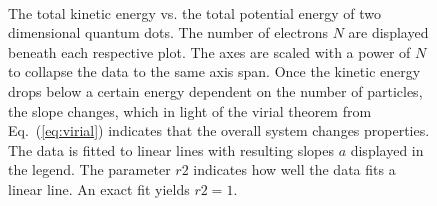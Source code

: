 \begin{figure}[h]
 \begin{center}
   \\
  \caption{The total kinetic energy vs. the total potential energy of two dimensional quantum dots. The number of electrons $N$ are displayed beneath each respective plot. The axes are scaled with a power of $N$ to collapse the data to the same axis span. Once the kinetic energy drops below a certain energy dependent on the number of particles, the slope changes, which in light of the virial theorem from Eq.~(\ref{eq:virial}) indicates that the overall system changes properties. The data is fitted to linear lines with resulting slopes $a$ displayed in the legend. The parameter $r2$ indicates how well the data fits a linear line. An exact fit yields $r2 = 1$.}
  \label{fig:V_dist_qdots}
 \end{center}
\end{figure}
\captionsetup[subfloat]{labelformat=parens}

